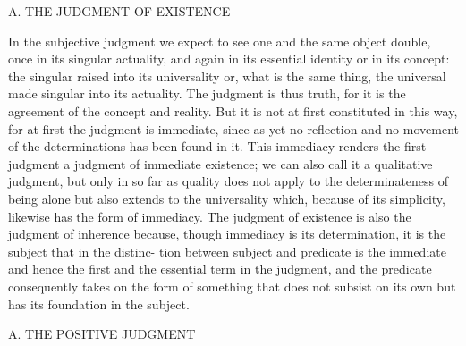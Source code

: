 
A. THE JUDGMENT OF EXISTENCE

In the subjective judgment we expect to see one and the same object double,
once in its singular actuality, and again in its essential identity or in its
concept: the singular raised into its universality or, what is the same thing,
the universal made singular into its actuality. The judgment is thus truth,
for it is the agreement of the concept and reality. But it is not at first
constituted in this way, for at first the judgment is immediate, since as yet
no reflection and no movement of the determinations has been found
in it. This immediacy renders the first judgment a judgment of immediate
existence; we can also call it a qualitative judgment, but only in so far as
quality does not apply to the determinateness of being alone but also extends
to the universality which, because of its simplicity, likewise has the form of
immediacy.
The judgment of existence is also the judgment of inherence because,
though immediacy is its determination, it is the subject that in the distinc-
tion between subject and predicate is the immediate and hence the first
and the essential term in the judgment, and the predicate consequently
takes on the form of something that does not subsist on its own but has its
foundation in the subject.

A. THE POSITIVE JUDGMENT

